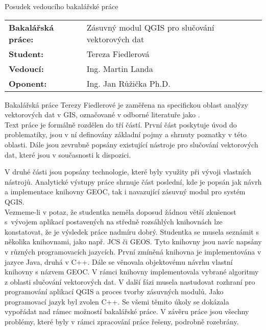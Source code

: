 \documentclass[czech,11pt,a4paper]{article}
\begin{document}
\begin{center}
  {\Large Posudek vedoucího bakalářské práce}
\end{center}

\vspace{.5cm}

\noindent \begin{tabular}{lp{}}
  {\bf Bakalářská práce:} &
  Zásuvný modul QGIS pro slučování vektorových dat \\
  {\bf Student:} & Tereza Fiedlerová \\
  {\bf Vedoucí:} & Ing. Martin Landa \\
  {\bf Oponent:} & Ing. Jan Růžička Ph.D. \\
\end{tabular}

\vspace{1cm}

Bakalářská práce Terezy Fiedlerové je zaměřena na specifickou oblast
analýzy vektorových dat v GIS, označované v odborné literatuře jako
.
\\

Text práce je formálně rozdělen do tří částí. První část poskytuje
úvod do problematiky, jsou v ní definovány základní pojmy a shrnuty
poznatky v této oblasti. Dále jsou zevrubně popsány existující
nástroje pro slučování vektorových dat, které jsou v současnosti k
dispozici.

V druhé části jsou popsány technologie, které byly využity při vývoji
vlastních nástrojů. Analytické výstupy práce shrnuje část poslední,
kde je popsán jak návrh a implementace knihovny GEOC, tak i navazující
zásuvný modul pro systém QGIS.
\\

Vezmeme-li v potaz, že studentka neměla doposud žádnou větší zkušenost
s~vývojem aplikací postavených na středně rozsáhlých knihovnách lze
konstatovat, že je výsledek práce nadmíru dobrý. Studentka se musela
seznámit s několika knihovnami, jako např. JCS či GEOS. Tyto knihovny
jsou navíc napsány v různých programovacích jazycích. První zmíněná
knihovna je implementována v jazyce Java, druhá v C++. Dále se
věnovala objektovému návrhu vlastní knihovny s názvem GEOC. V rámci
knihovny implementovala vybrané algo\-ritmy z oblasti slučování
vektorových dat. V další fázi musela nastudovat rozhraní pro
programování aplikací QGIS a proces tvorby zásuvných modulů. Jako
programovací jazyk byl zvolen C++. Se všemi těmito úkoly se dokázala
vypořádat nad rámec možností bakalářské práce. V závěru práce jsou
všechny problémy, které byly v rámci zpracování práce řešeny, podrobně
rozebrány.
\\
\end{document}

